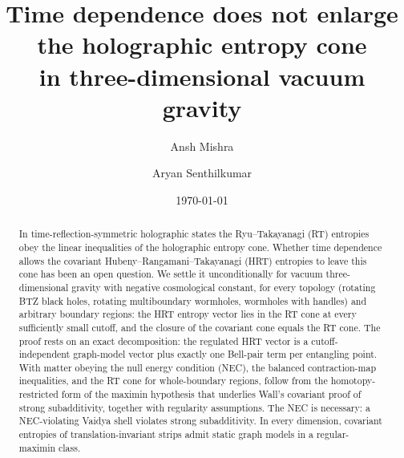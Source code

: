 \documentclass[aps,prl,twocolumn,superscriptaddress,nofootinbib,amsmath,amssymb]{revtex4-2}
\newcommand{\ScopeShort}{vacuum}
\theoremstyle{definition}
\begin{document}
\title{Time dependence does not enlarge the holographic entropy cone\\ in three-dimensional vacuum gravity}

\author{Ansh Mishra}
\author{Aryan Senthilkumar}

\date{\today}

\begin{abstract}
In time-reflection-symmetric holographic states the Ryu--Takayanagi (RT) entropies obey the linear
inequalities of the holographic entropy cone. Whether time dependence allows the covariant
Hubeny--Rangamani--Takayanagi (HRT) entropies to leave this cone has been an open question. We settle it
unconditionally for \ScopeShort{} three-dimensional gravity with negative cosmological constant, for every topology (rotating BTZ
black holes, rotating multiboundary wormholes, wormholes with handles) and arbitrary boundary regions: the HRT
entropy vector lies in the RT cone at every sufficiently small cutoff, and the closure of the covariant cone
equals the RT cone. The proof rests on an exact decomposition: the regulated HRT vector is a
cutoff-independent graph-model vector plus exactly one Bell-pair term per entangling point. With matter obeying
the null energy condition (NEC), the balanced contraction-map inequalities, and the RT cone for whole-boundary
regions, follow from the homotopy-restricted form of the maximin hypothesis that underlies Wall's covariant proof
of strong subadditivity, together with regularity assumptions. The NEC is necessary: a NEC-violating Vaidya shell violates strong subadditivity. In every
dimension, covariant entropies of translation-invariant strips admit static graph models in a regular-maximin class.
\end{abstract}

\maketitle
\end{document}

